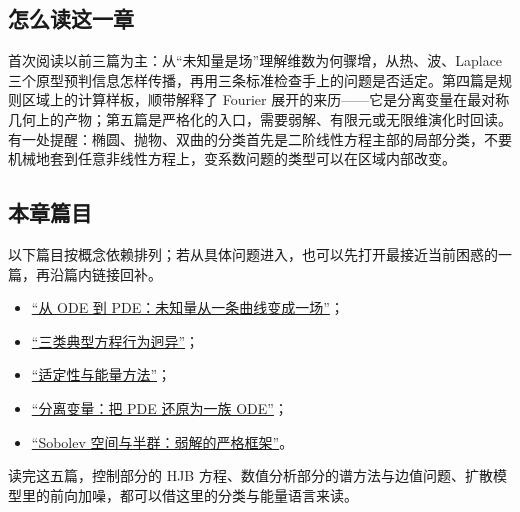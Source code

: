 \subsection{怎么读这一章}

首次阅读以前三篇为主：从``未知量是场''理解维数为何骤增，从热、波、Laplace 三个原型预判信息怎样传播，再用三条标准检查手上的问题是否适定。第四篇是规则区域上的计算样板，顺带解释了 Fourier 展开的来历——它是分离变量在最对称几何上的产物；第五篇是严格化的入口，需要弱解、有限元或无限维演化时回读。有一处提醒：椭圆、抛物、双曲的分类首先是二阶线性方程主部的局部分类，不要机械地套到任意非线性方程上，变系数问题的类型可以在区域内部改变。

\subsection{本章篇目}

以下篇目按概念依赖排列；若从具体问题进入，也可以先打开最接近当前困惑的一篇，再沿篇内链接回补。

\begin{itemize}
\tightlist
\item \hyperref[sec:15-Differential-Equations-and-Dynamical-Systems/03-PDE-Introduction/01]{``从 ODE 到 PDE：未知量从一条曲线变成一场''}；
\item \hyperref[sec:15-Differential-Equations-and-Dynamical-Systems/03-PDE-Introduction/02]{``三类典型方程行为迥异''}；
\item \hyperref[sec:15-Differential-Equations-and-Dynamical-Systems/03-PDE-Introduction/03]{``适定性与能量方法''}；
\item \hyperref[sec:15-Differential-Equations-and-Dynamical-Systems/03-PDE-Introduction/04]{``分离变量：把 PDE 还原为一族 ODE''}；
\item \hyperref[sec:15-Differential-Equations-and-Dynamical-Systems/03-PDE-Introduction/05]{``Sobolev 空间与半群：弱解的严格框架''}。
\end{itemize}

读完这五篇，控制部分的 HJB 方程、数值分析部分的谱方法与边值问题、扩散模型里的前向加噪，都可以借这里的分类与能量语言来读。
